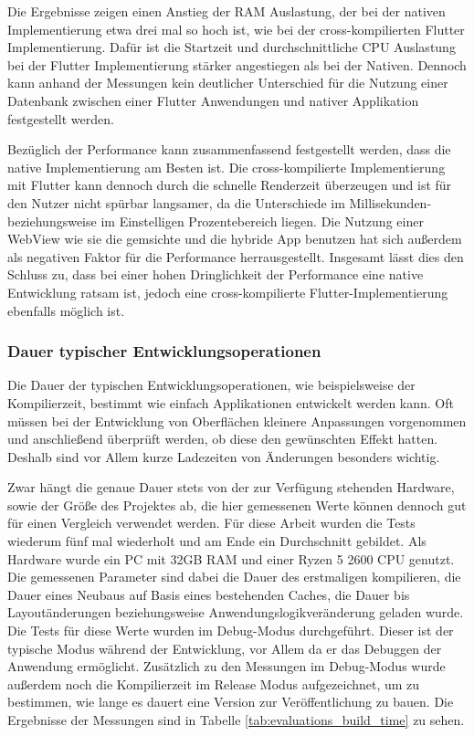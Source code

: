 Die Ergebnisse zeigen einen Anstieg der RAM Auslastung, der bei der nativen Implementierung etwa drei mal so hoch ist, wie bei der cross-kompilierten Flutter Implementierung. Dafür ist die Startzeit und durchschnittliche CPU Auslastung bei der Flutter Implementierung stärker angestiegen als bei der Nativen. Dennoch kann anhand der Messungen kein deutlicher Unterschied für die Nutzung einer Datenbank zwischen einer Flutter Anwendungen und nativer Applikation festgestellt werden.

Bezüglich der Performance kann zusammenfassend festgestellt werden, dass die native Implementierung am Besten ist. Die cross-kompilierte Implementierung mit Flutter kann dennoch durch die schnelle Renderzeit überzeugen und ist für den Nutzer nicht spürbar langsamer, da die Unterschiede im Millisekunden- beziehungsweise im Einstelligen Prozentebereich liegen. Die Nutzung einer WebView wie sie die gemsichte und die hybride App benutzen hat sich außerdem als negativen Faktor für die Performance herrausgestellt.
Insgesamt lässt dies den Schluss zu, dass bei einer hohen Dringlichkeit der Performance eine native Entwicklung ratsam ist, jedoch eine cross-kompilierte Flutter-Implementierung ebenfalls möglich ist.

\subsubsection{Dauer typischer Entwicklungsoperationen}
Die Dauer der typischen Entwicklungsoperationen, wie beispielsweise der Kompilierzeit, bestimmt wie einfach Applikationen entwickelt werden kann. Oft müssen bei der Entwicklung von Oberflächen kleinere Anpassungen vorgenommen und anschließend überprüft werden, ob diese den gewünschten Effekt hatten. Deshalb sind vor Allem kurze Ladezeiten von Änderungen besonders wichtig.

Zwar hängt die genaue Dauer stets von der zur Verfügung stehenden Hardware, sowie der Größe des Projektes ab, die hier gemessenen Werte können dennoch gut für einen Vergleich verwendet werden. 
Für diese Arbeit wurden die Tests wiederum fünf mal wiederholt und am Ende ein Durchschnitt gebildet. Als Hardware wurde ein PC mit 32GB RAM und einer Ryzen 5 2600 CPU genutzt. 
Die gemessenen Parameter sind dabei die Dauer des erstmaligen kompilieren, die Dauer eines Neubaus auf Basis eines bestehenden Caches, die Dauer bis Layoutänderungen beziehungsweise Anwendungslogikveränderung geladen wurde. 
Die Tests für diese Werte wurden im Debug-Modus durchgeführt. Dieser ist der typische Modus während der Entwicklung, vor Allem da er das Debuggen der Anwendung ermöglicht. Zusätzlich zu den Messungen im Debug-Modus wurde außerdem noch die Kompilierzeit im Release Modus aufgezeichnet, um zu bestimmen, wie lange es dauert eine Version zur Veröffentlichung zu bauen. Die Ergebnisse der Messungen sind in Tabelle \ref{tab:evaluations_build_time} zu sehen.

